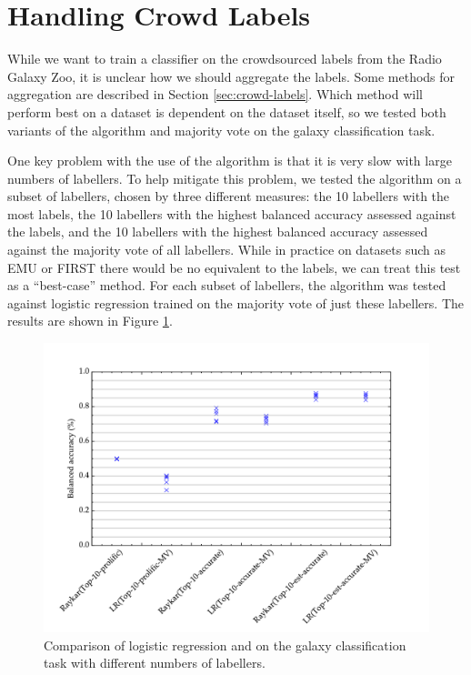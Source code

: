 \section{Handling Crowd Labels}
\label{sec:rgz-crowd-labels}

  While we want to train a classifier on the crowdsourced labels from the Radio
  Galaxy Zoo, it is unclear how we should aggregate the labels. Some methods for
  aggregation are described in Section \ref{sec:crowd-labels}. Which method will
  perform best on a dataset is dependent on the dataset itself, so we tested
  both variants of the \citeauthor{raykar10} algorithm and majority vote on the
  galaxy classification task.

  One key problem with the use of the \citeauthor{raykar10} algorithm is that it
  is very slow with large numbers of labellers. To help mitigate this problem,
  we tested the algorithm on a subset of labellers, chosen by three different
  measures: the 10 labellers with the most labels, the 10 labellers with the
  highest balanced accuracy assessed against the \citeauthor{norris06} labels,
  and the 10 labellers with the highest balanced accuracy assessed against the
  majority vote of all labellers. While in practice on datasets such as EMU or
  FIRST there would be no equivalent to the \citeauthor{norris06} labels, we can
  treat this test as a ``best-case'' method. For each subset of labellers, the
  \citeauthor{raykar10} algorithm was tested against logistic regression trained
  on the majority vote of just these labellers. The results are shown in Figure
  \ref{fig:rgz-raykar}.

  \begin{figure}[!ht]
    \centering
    \includegraphics[width=\textwidth]{images/experiments/rgz_raykar}
    \caption{Comparison of logistic regression and \citeauthor{raykar10} on the
      galaxy classification task with different numbers of labellers.}
    \label{fig:rgz-raykar}
  \end{figure}

